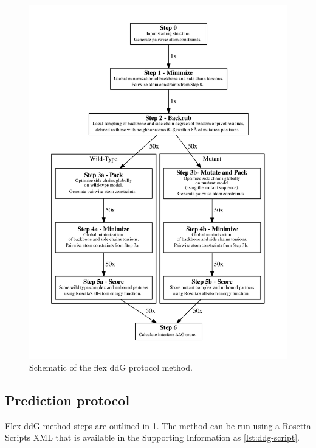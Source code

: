 \begin{figure}
  \centering
  \includegraphics[width=\textwidth,keepaspectratio]{figures/fig-overview.pdf}
    \caption[]{
      Schematic of the flex ddG protocol method.
  } \label{fig:figure-overview}
\end{figure}

\subsection{Prediction protocol}

Flex ddG method steps are outlined in \cref{fig:figure-overview}. The method can be run using a Rosetta Scripts XML that is available in the Supporting Information as \cref{lst:ddg-script}.

